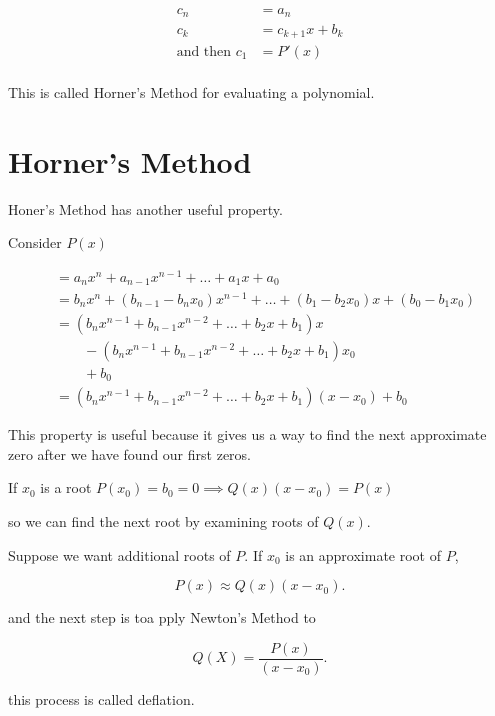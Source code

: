 \begin{align*}
  c_n &= a_n \\
  c_k &=  c_{k+1}x + b_{k} \\
  \text{and then } c_1 &= P'(x) \\
\end{align*}

This is called Horner's Method for evaluating a polynomial.

\section{Horner's Method}

Honer's Method has another useful property. 

Consider $P(x)$

\begin{align*}
    &= a_n x^n + a_{n-1} x^{n-1} + \dots + a_1 x + a_0 \\
    &= b_n x^n + (b_{n-1} - b_n x_0) x^{n-1} + \dots + (b_1 - b_2 x_0) x + (b_0 - b_1 x_0) \\
    &= (b_n x^{n-1} + b_{n-1} x^{n-2} + \dots + b_2 x + b_1) x \\
    &\qquad - (b_n x^{n-1} + b_{n-1} x^{n-2} + \dots + b_2 x + b_1) x_0 \\
    &\qquad + b_0 \\
    &= (b_n x^{n-1} + b_{n-1} x^{n-2} + \dots + b_2 x + b_1) (x - x_0) + b_0
\end{align*}

This property is useful because it gives us a way to find the next approximate
zero after we have found our first zeros.

\ie If $x_0$ is a root $P(x_0) = b_0 = 0\implies Q(x) (x-x_0) = P(x)$

so we can find the next root by examining roots of $Q(x)$.

Suppose we want additional roots of $P$. If $x_0$ is an approximate root of $P$,

\[
  P(x) \approx Q(x) (x-x_0) 
.\]

and the next step is toa pply Newton's Method to 

\[
  \displaystyle Q(X) = \frac{P(x)}{(x-x_0)}
.\]

this process is called deflation.

